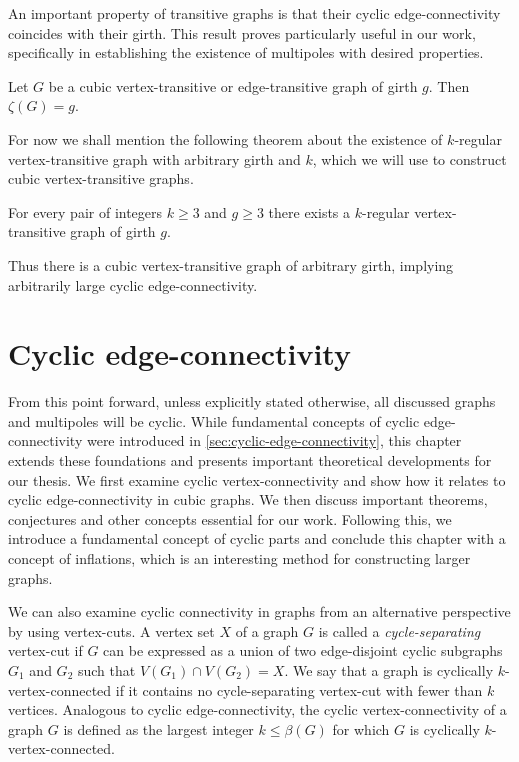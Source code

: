 \documentclass[12pt, twoside]{book}
\begin{document}
An important property of transitive graphs is that their cyclic edge-connectivity coincides with their girth. This result proves particularly useful in our work, specifically in establishing the existence of multipoles with desired properties.

\begin{theorem}\label{th:cyclic-connectivity-of-transitive}
	Let $G$ be a cubic \mbox{vertex-transitive} or \mbox{edge-transitive} graph of girth $g$. Then $\zeta(G) = g$.
\end{theorem}

For now we shall mention the following theorem about the existence of $k$-regular vertex-transitive graph with arbitrary girth and $k$, which we will use to construct cubic vertex-transitive graphs.

\begin{theorem}\label{th:vertex-transitive-girth-regular}
	For every pair of integers $k \geq 3$ and $g \geq 3$ there exists a $k$-regular vertex-transitive graph of girth $g$.
\end{theorem}

Thus there is a cubic vertex-transitive graph of arbitrary girth, implying arbitrarily large cyclic \mbox{edge-connectivity}.

\chapter{Cyclic edge-connectivity}\label{ch:cyclic-edge-connectivity}

From this point forward, unless explicitly stated otherwise, all discussed graphs and multipoles will be cyclic. While fundamental concepts of cyclic edge-connectivity were introduced in \cref{sec:cyclic-edge-connectivity}, this chapter extends these foundations and presents important theoretical developments for our thesis. We first examine cyclic vertex-connectivity and show how it relates to cyclic edge-connectivity in cubic graphs. We then discuss important theorems, conjectures and other concepts essential for our work. Following this, we introduce a fundamental concept of cyclic parts and conclude this chapter with a concept of inflations, which is an interesting method for constructing larger graphs.

We can also examine cyclic connectivity in graphs from an alternative perspective by using vertex-cuts. A vertex set $X$ of a graph $G$ is called a \mbox{\textit{cycle-separating}} vertex-cut if $G$ can be expressed as a union
of two edge-disjoint cyclic subgraphs $G_1$ and $G_2$ such that $V(G_1) \cap V(G_2) = X$. We say that a graph is cyclically \mbox{$k$-vertex-connected} if it contains no cycle-separating vertex-cut with fewer than $k$ vertices. Analogous to cyclic \mbox{edge-connectivity}, the cyclic \mbox{vertex-connectivity} of a graph $G$ is defined as the largest integer $k\leq \beta(G)$ for which $G$ is cyclically \mbox{$k$-vertex-connected}.
\end{document}
